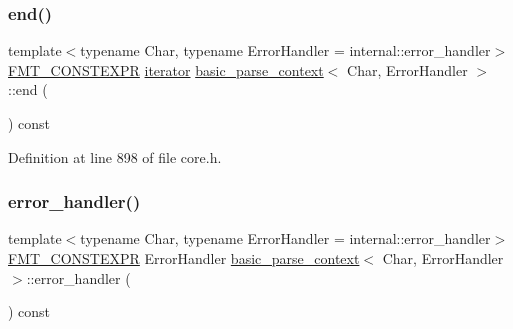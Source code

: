 \mbox{\label{classbasic__parse__context_a98a62ad72f0a71feb602f74d9e4a2434}} 
\subsubsection{\texorpdfstring{end()}{end()}}
{\footnotesize\ttfamily template$<$typename Char, typename Error\+Handler = internal\+::error\+\_\+handler$>$ \\
\hyperlink{core_8h_a69201cb276383873487bf68b4ef8b4cd}{F\+M\+T\+\_\+\+C\+O\+N\+S\+T\+E\+X\+PR} \hyperlink{classbasic__parse__context_ac3ff96575e89371a99076d8e84dbdbee}{iterator} \hyperlink{classbasic__parse__context}{basic\+\_\+parse\+\_\+context}$<$ Char, Error\+Handler $>$\+::end (\begin{DoxyParamCaption}{ }\end{DoxyParamCaption}) const\hspace{0.3cm}{\ttfamily [inline]}}



Definition at line 898 of file core.\+h.

\mbox{\label{classbasic__parse__context_a3d7ff4e0bfe29c60c028b6d7c3ed1c1c}} 
\subsubsection{\texorpdfstring{error\+\_\+handler()}{error\_handler()}}
{\footnotesize\ttfamily template$<$typename Char, typename Error\+Handler = internal\+::error\+\_\+handler$>$ \\
\hyperlink{core_8h_a69201cb276383873487bf68b4ef8b4cd}{F\+M\+T\+\_\+\+C\+O\+N\+S\+T\+E\+X\+PR} Error\+Handler \hyperlink{classbasic__parse__context}{basic\+\_\+parse\+\_\+context}$<$ Char, Error\+Handler $>$\+::error\+\_\+handler (\begin{DoxyParamCaption}{ }\end{DoxyParamCaption}) const\hspace{0.3cm}{\ttfamily [inline]}}




